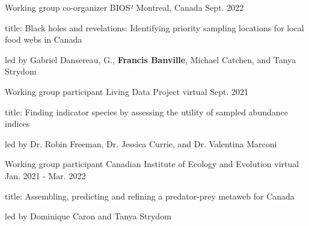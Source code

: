 
\begin{cventries}

  \cventry
    {Working group co-organizer} %
    {BIOS²} %
    {Montreal, Canada} %
    {Sept. 2022} %
    {
      \begin{cvitems} %
        \item {title: Black holes and revelations: Identifying priority sampling locations for local food webs in Canada}
        \item {led by Gabriel Dansereau, G., \textbf{Francis Banville}, Michael Catchen, and Tanya Strydom}
      \end{cvitems}
    }

  \cventry
    {Working group participant} %
    {Living Data Project} %
    {virtual} %
    {Sept. 2021} %
    {
      \begin{cvitems} %
        \item {title: Finding indicator species by assessing the utility of sampled abundance indices}
        \item {led by Dr. Robin Freeman, Dr. Jessica Currie, and Dr. Valentina Marconi}
      \end{cvitems}
    }

  \cventry
    {Working group participant} %
    {Canadian Institute of Ecology and Evolution} %
    {virtual} %
    {Jan. 2021 - Mar. 2022} %
    {
      \begin{cvitems} %
        \item {title: Assembling, predicting and refining a predator-prey metaweb for Canada}
        \item {led by Dominique Caron and Tanya Strydom}
      \end{cvitems}
    }
    
\end{cventries}